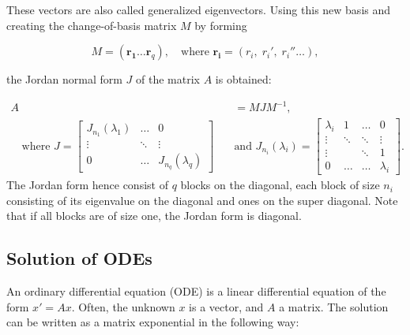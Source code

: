 \documentclass[../main.tex]{subfiles}
\begin{document}
These vectors are also called generalized eigenvectors. Using this new basis and creating the change-of-basis matrix $M$ by forming

\begin{equation}\label{chofba}
    M = (\boldsymbol{r_1} \dots \boldsymbol{r}_q), \quad \text{where } \boldsymbol{r_i} = (r_i,\; r_i',\; r_i'' \dots), 
\end{equation}

the Jordan normal form $J$ of the matrix $A$ is obtained:

\begin{equation}
\begin{aligned}
    A &= MJM^{-1}, \\ \quad \text{where } J = \begin{bmatrix}J_{n_1}(\lambda_1) & \dots & 0 \\
                                                         \vdots & \ddots & \vdots \\
                                                         0 & \dots &  J_{n_q}(\lambda_q)\end{bmatrix} \quad
      &\text{and } J_{n_i}(\lambda_i) = \begin{bmatrix} \lambda_i & 1 & \dots & 0 \\
                                                                                        \vdots  & \ddots & \ddots & \vdots \\
                                                                                        \vdots & & \ddots& 1 \\
                                                                                        0 & \dots & \dots & \lambda_i\end{bmatrix}.
\end{aligned}
\end{equation}
The Jordan form hence consist of $q$ blocks on the diagonal, each block of size $n_i$ consisting of its eigenvalue on the diagonal and ones on the super diagonal. Note that if all blocks are of size one, the Jordan form is diagonal.

\subsection{Solution of ODEs}
An ordinary differential equation (ODE) is a linear differential equation of the form $x'=Ax$. Often, the unknown $x$ is a vector, and $A$ a matrix. The solution can be written as a matrix exponential in the following way:
\end{document}
